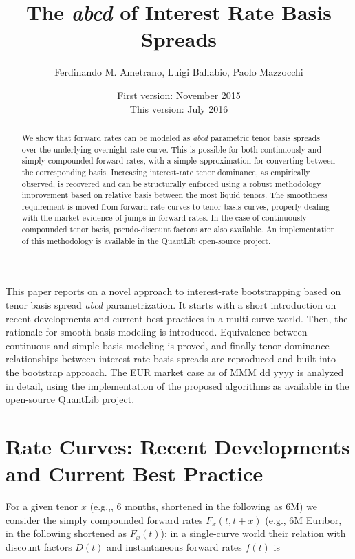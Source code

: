 \documentclass{article}
\title{The \textit{abcd} of Interest Rate Basis Spreads}
\author{Ferdinando M. Ametrano, Luigi Ballabio, Paolo Mazzocchi}
\date{First version: November 2015\\
      This version: July 2016}
\begin{document}
\maketitle

\begin{abstract}
    We show that forward rates can be modeled as \textit{abcd} parametric tenor basis spreads over the underlying overnight rate curve. This is possible for both continuously and simply compounded forward rates, with a simple approximation for converting between the corresponding basis. Increasing interest-rate tenor dominance, as empirically observed, is recovered and can be structurally enforced using a robust methodology improvement based on relative basis between the most liquid tenors. The smoothness requirement is moved from forward rate curves to tenor basis curves, properly dealing with the market evidence of jumps in forward rates. In the case of continuously compounded tenor basis, pseudo-discount factors are also available. An implementation of this methodology is available in the QuantLib open-source project.
\end{abstract}






\noindent
This paper reports on a novel approach to interest-rate bootstrapping based on tenor basis spread \textit{abcd} parametrization.
It starts with a short introduction on recent developments and current best practices in a multi-curve world. Then, the rationale for smooth basis modeling is introduced. Equivalence between continuous and simple basis modeling is proved, and finally tenor-dominance relationships between interest-rate basis spreads are reproduced and built into the bootstrap approach. The EUR market case as of MMM dd yyyy is analyzed in detail, using the implementation of the proposed algorithms as available in the open-source QuantLib \cite{QuantLib} project.









\section{Rate Curves: Recent Developments and Current Best Practice}

For a given tenor $x$ (e.g.,, 6 months, shortened in the following as 6M) we consider the simply compounded forward rates $F_x(t, t+x)$ (e.g., 6M Euribor, in the following shortened as $F_x(t)$): in a single-curve world their relation with discount factors $D(t)$ and instantaneous forward rates $f(t)$ is
\end{document}

